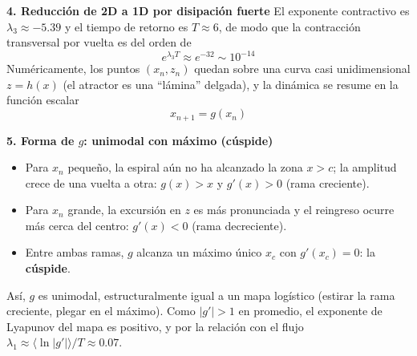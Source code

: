 \documentclass[11pt,a4paper]{article}
\newenvironment{solucion}[1][Solución Detallada]{%
    \vspace{1.5mm}%
    \noindent{\large\textbf{Solución:}}\par\vspace{1.5mm}%
}{%
    \par\vspace{3mm}%
}
\begin{document}
\begin{solucion}
\vspace{3.5mm}

\textbf{\large 4. Reducción de 2D a 1D por disipación fuerte}
El exponente contractivo es $\lambda_3 \approx -5.39$ y el tiempo de retorno es $T \approx 6$, de modo que la contracción transversal por vuelta es del orden de
\[
e^{\lambda_3 T} \approx e^{-32} \sim 10^{-14}
\]
Numéricamente, los puntos $(x_n, z_n)$ quedan sobre una curva casi unidimensional $z = h(x)$ (el atractor es una ``lámina'' delgada), y la dinámica se resume en la función escalar
\[
\boxed{x_{n+1} = g(x_n)}
\]

\vspace{3.5mm}

\textbf{\large 5. Forma de $g$: unimodal con máximo (cúspide)}
\begin{itemize}[leftmargin=2em]
    \item Para $x_n$ pequeño, la espiral aún no ha alcanzado la zona $x > c$; la amplitud crece de una vuelta a otra: $g(x) > x$ y $g'(x) > 0$ (rama creciente).
    \item Para $x_n$ grande, la excursión en $z$ es más pronunciada y el reingreso ocurre más cerca del centro: $g'(x) < 0$ (rama decreciente).
    \item Entre ambas ramas, $g$ alcanza un máximo único $x_c$ con $g'(x_c) = 0$: la \textbf{cúspide}.
\end{itemize}
Así, $g$ es unimodal, estructuralmente igual a un mapa logístico (estirar la rama creciente, plegar en el máximo). Como $|g'| > 1$ en promedio, el exponente de Lyapunov del mapa es positivo, y por la relación con el flujo $\lambda_1 \approx \langle\ln|g'|\rangle / T \approx 0.07$.

\begin{center}
\end{center}

\end{solucion}
\end{document}

